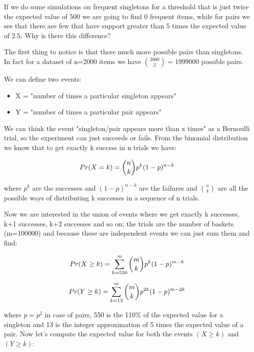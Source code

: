 \documentclass{article}
\begin{document}
If we do some simulations on frequent singletons for a threshold that is just twice the expected value of 500 we are going to find 0 frequent items, while for pairs we see that there are few that have support greater than 5 times the expected value of 2.5. Why is there this difference?

The first thing to notice is that there much more possible pairs than singletons. In fact for  a dataset of n=2000 items we have ${2000 \choose 2} = 1999000$ possible pairs.

We can define two events:

\begin{itemize}
	\item X = "number of times a particular singleton appears"
	\item Y = "number of times a particular pair appears"	
\end{itemize}

We can think the event "singleton/pair appears more than x times" as a Bernoulli trial, so the experiment can just succeeds or fails.
From the binomial distribution we know that to get exactly k success in n trials we have:

\begin{equation} {\label{eq:binomialDistribution}}
Pr(X = k) = {n \choose k} p^k (1-p)^{n-k}
\end{equation}

where $p^k$ are the successes and $(1-p)^{n-k}$ are the failures and ${n \choose k}$ are all the possible ways of distributing k successes in a sequence of n trials.

Now we are interested in the union of events where we get exactly k successes, k+1 successes, k+2 successes and so on; the trials are the number of baskets (m=100000) and
because these are independent events we can just sum them and find:

\begin{equation} {\label{eq:probx}}
Pr(X \geq k) = \sum_{k=550}^{m} {m \choose k} p^k (1-p)^{m-k}
\end{equation}

\begin{equation} {\label{eq:proby}}
Pr(Y \geq k) = \sum_{k=13}^{m} {m \choose k} p^{2k} (1-p)^{m-2k}
\end{equation}

where $p=p^2$ in case of pairs, 550 is the 110\% of the expected value for a singleton and 13 is the integer approximation of 5 times the expected value of a pair.
Now let's compute the expected value for both the events $(X \geq k)$ and $(Y \geq k)$:
\end{document}
